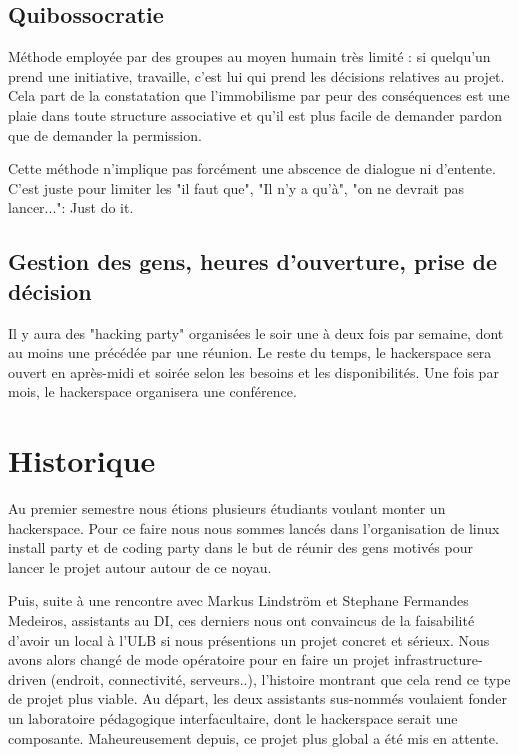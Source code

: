 \documentclass{article}
\begin{document}
\subsection{Quibossocratie}

Méthode employée par des groupes au moyen humain très limité : si quelqu'un prend 
une initiative, travaille, c'est lui qui prend les décisions relatives au projet. 
Cela part de la constatation que l'immobilisme par peur des conséquences est une 
plaie dans toute structure associative et qu'il est plus facile de demander pardon 
que de demander la permission.

Cette méthode n'implique pas forcément une abscence de dialogue ni d'entente. 
C'est juste pour limiter les "il faut que", "Il n'y a qu'à", "on ne devrait pas lancer...": Just do it.

\subsection{Gestion des gens, heures d'ouverture, prise de décision}

Il y aura des "hacking party" organisées le soir une à deux fois par semaine, dont au moins
une précédée par une réunion.
Le reste du temps, le hackerspace sera ouvert en après-midi et soirée selon les 
besoins et les disponibilités.
Une fois par mois, le hackerspace organisera une conférence.

\newpage
\section{Historique}

Au premier semestre nous étions plusieurs étudiants voulant monter un hackerspace.
Pour ce faire nous nous sommes lancés dans l'organisation de linux install party et
de coding party dans le but de réunir des gens motivés pour lancer le projet autour
autour de ce noyau.

Puis, suite à une rencontre avec Markus Lindström et Stephane Fermandes Medeiros, assistants au DI, ces derniers nous ont convaincus de la faisabilité d'avoir un local à
l'ULB si nous présentions un projet concret et sérieux. Nous avons alors changé de mode
opératoire pour en faire un projet infrastructure-driven (endroit, connectivité, serveurs..),
l'histoire montrant que cela rend ce type de projet plus viable.  Au départ, les deux
assistants  sus-nommés voulaient fonder un laboratoire pédagogique interfacultaire,
dont le hackerspace serait une composante. Maheureusement depuis, ce projet plus
global a été mis en attente.
\end{document}
